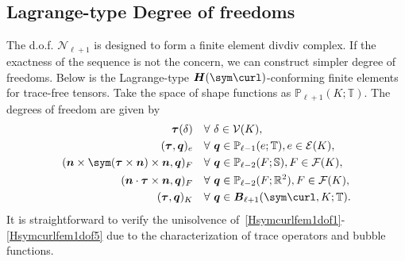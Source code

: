 \subsection{Lagrange-type Degree of freedoms}
The d.o.f. $\mathcal N_{\ell +1}$ is designed to form a finite element divdiv complex. If the exactness of the sequence is not the concern, we can construct simpler degree of freedoms.  Below is the Lagrange-type $\boldsymbol H(\sym\curl)$-conforming finite elements for trace-free tensors.
Take the space of shape functions as $\mathbb P_{\ell+1}(K;\mathbb T)$.
The degrees of freedom are given by
\begin{align}
\boldsymbol \tau(\delta) & \quad\forall~\delta\in \mathcal V(K), \label{Hsymcurlfem1dof1}\\
(\boldsymbol \tau, \boldsymbol q)_e & \quad\forall~\boldsymbol q\in\mathbb P_{\ell-1}(e;\mathbb T),  e\in\mathcal E(K),\label{Hsymcurlfem1dof2}\\
(\boldsymbol n\times \sym(\boldsymbol\tau\times\boldsymbol n)\times \boldsymbol n, \boldsymbol q)_F &\quad\forall~\boldsymbol q\in\mathbb P_{\ell-2}(F;\mathbb S), F\in\mathcal F(K),\label{Hsymcurlfem1dof3}\\
(\boldsymbol n\cdot \boldsymbol\tau\times\boldsymbol n, \boldsymbol q)_F & \quad\forall~\boldsymbol q\in\mathbb P_{\ell-2}(F;\mathbb R^2),  F\in\mathcal F(K),\label{Hsymcurlfem1dof4}\\
(\boldsymbol \tau, \boldsymbol q)_K & \quad\forall~\boldsymbol q\in\boldsymbol B_{\ell+1}(\sym\curl, K;\mathbb T). \label{Hsymcurlfem1dof5} 
\end{align}
It is straightforward to verify the unisolvence of~\eqref{Hsymcurlfem1dof1}-\eqref{Hsymcurlfem1dof5}  due to the characterization of trace operators and bubble functions. 



